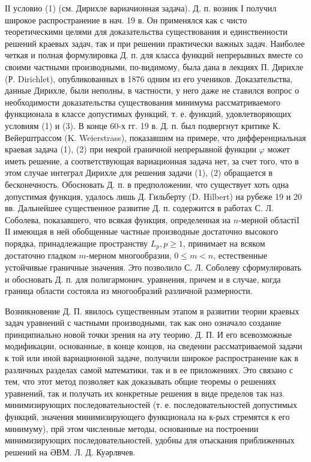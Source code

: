 \documentclass[10pt]{article}
\begin{document}
ІІ условио (1) (см. Дирихле вариачионная задача). Д. п. возник І получил широкое распространение в нач. 19 в. Он применялся как с чисто теоретическими целями для доказательства существования и единственности решений краевых задач, так и при решении практически важных задач. Наиболее четкая и полная формулировка Д. п. для класса функций непрерывных вместе со своими частными производными, по-видимому, была дана в лекциях П. Дирихле (Р. Dirichlet), опубликованных в 1876 одним из его учеников. Доказательства, данные Дирихле, были неполны, в частности, у него даже не ставился вопрос о необходимости доказательства существования минимума рассматриваемого функционала в классе допустимых функций, т. е. функций, удовлетворяющих условиям (1) и (3). В конце 60-х гг. 19 в. Д. п. был подвергнут критике К. Вейерштрассом (K. Weierstrass), показавшим на примере, что дифференциальная краевая задача (1), (2) при некрой граничной непрерывной функции $\varphi$ может иметь решение, а соответствующая вариационная задача нет, за счет того, что в этом случае интеграл Дирихле для решения задачи (1), (2) обращается в бесконечность. Обосновать Д. п. в предположении, что существует хоть одна допустимая функция, удалось лишь Д. Гильберту (D. Hilbert) на рубеже 19 и 20 вв. Дальнейшее существенное развитие Д. п. содержится в работах С. Л. Соболева, показавшего, что всякая функция, определенная на $n$-мерной областіI ІІ имеющая в ней обобщенные частные производные достаточно высокого порядка, принадлежащие пространству $L_{p}, p \geqslant 1$, принимает на всяком достаточно гладком $m$-мерном многообразии, $0 \leqslant m<n$, естественные устойчивые граничные значения. Это позволило С. Л. Соболеву сформулировать и обосновать Д. п. для полигармонич. уравнения, причем и в случае, когда граница области состояла из многообразий различной размерности.



Возникновение Д. П. явилось существенным этапом в развитии теории краевых задач уравнений с частными производными, так как оно означало создание принципиально новой точки зрения на әту теорию. Д. П. И его всевозможные модификации, основанные, в конце концов, на сведении рассматриваемой задачи к той или иной вариационной задаче, получили широкое распространение как в различных разделах самой математики, так и в ее приложениях. Это связано с тем, что этот метод позволяет как доказывать общие теоремы о решениях уравнений, так и получать их конкретные решения в виде пределов так наз. минимизирующих последовательностей (т. е. последовательностей допустимых функций, значения минимизирующего функционала на к-рых стремятся к его минимуму), прй этом численные методы, основанные на построении минимизирующих последовательностей, удобны для отыскания приближенных решений на ӘВМ. Л. Д. Куәрлвчев.
\end{document}
